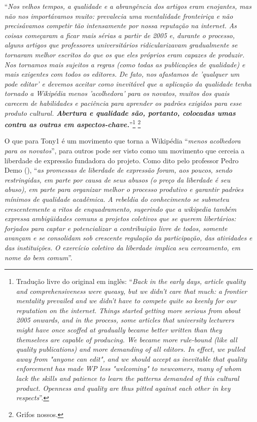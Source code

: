 ``\textit{Nos velhos tempos, a qualidade e a abrangência dos artigos eram enojantes, mas não nos importávamos muito: prevalecia uma mentalidade fronteiriça e não precisávamos competir tão intensamente por nossa reputação na internet. As coisas começaram a ficar mais sérias a partir de 2005 e, durante o processo, alguns artigos que professores universitários ridicularizavam gradualmente se tornaram melhor escritos do que os que eles próprios eram capazes de produzir. Nos tornamos mais sujeitos a regras (como todas as publicações de qualidade) e mais exigentes com todos os editores. De fato, nos afastamos de 'qualquer um pode editar' e devemos aceitar como inevitável que a aplicação da qualidade tenha tornado a Wikipédia menos 'acolhedora' para os novatos, muitos dos quais carecem de habilidades e paciência para aprender os padrões exigidos para esse produto cultural. \textbf{Abertura e qualidade são, portanto, colocadas umas contra as outras em aspectos-chave.}}''\footnote{Tradução livre do original em inglês: ``\textit{Back in the early days, article quality and comprehensiveness were queasy, but we didn't care that much: a frontier mentality prevailed and we didn't have to compete quite so keenly for our reputation on the internet. Things started getting more serious from about 2005 onwards, and in the process, some articles that university lecturers might have once scoffed at gradually became better written than they themselves are capable of producing. We became more rule-bound (like all quality publications) and more demanding of all editors. In effect, we pulled away from "anyone can edit", and we should accept as inevitable that quality enforcement has made WP less "welcoming" to newcomers, many of whom lack the skills and patience to learn the patterns demanded of this cultural product. Openness and quality are thus pitted against each other in key respects}''.} \footnote{Grifos nossos.}

O que para Tony1 é um movimento que torna a Wikipédia ``\textit{menos acolhedora para os novatos}'', para outros pode ser visto como um movimento que cerceia a liberdade de expressão fundadora do projeto. Como dito pelo professor Pedro Demo (\citeyear{demo_conhecimento_2009}), ``\textit{as promessas de liberdade de expressão foram, aos poucos, sendo restringidas, em parte por causa de seus abusos (o preço da liberdade é seu abuso), em parte para organizar melhor o processo produtivo e garantir padrões mínimos de qualidade acadêmica. A rebeldia do conhecimento se submeteu crescentemente a ritos de enquadramento, sugerindo que a wikipedia também expressa ambigüidades comuns a projetos coletivos que se querem libertários: forjados para captar e potencializar a contribuição livre de todos, somente avançam e se consolidam sob crescente regulação da participação, das atividades e das instituições. O exercício coletivo da liberdade implica seu cerceamento, em nome do bem comum}''.

